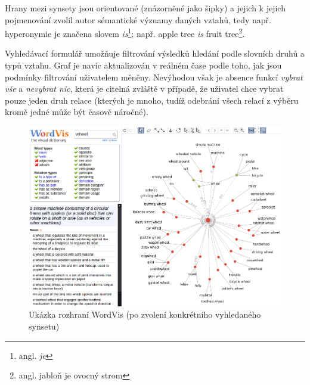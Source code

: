 \documentclass[a4paper, 11pt, oneside]{book}
\newcommand\ex{\textsf}
\begin{document}
				Hrany mezi synsety jsou orientované (znázorněné jako šipky) a jejich k jejich pojmenování zvolil autor sémantické významy daných vztahů, tedy např. hyperonymie je značena slovem \textit{is}\footnote{angl. \textit{je}}; např. \ex{apple tree \textit{is} fruit tree}\footnote{angl. jabloň je ovocný strom}.

				Vyhledávací formulář umožňuje filtrování výsledků hledání podle slovních druhů a typů vztahu. Graf je navíc aktualizován v reálném čase podle toho, jak jsou podmínky filtrování uživatelem měněny. Nevýhodou však je absence funkcí \textit{vybrat vše} a \textit{nevybrat nic}, která je citelná zvláště v případě, že uživatel chce vybrat pouze jeden druh relace (kterých je mnoho, tudíž odebrání všech relací z výběru kromě jedné může být časově náročné).

				\begin{figure}[h]
					\centering
					\includegraphics[width=1.0\textwidth]{wordvis.png}
					\caption{Ukázka rozhraní WordVis (po zvolení konkrétního vyhledaného synsetu)}
					\label{fig:wordvis}
				\end{figure}
\end{document}

